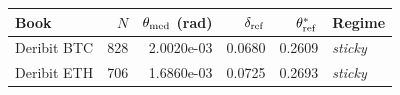 \begin{tabular}{@{}lrrrrl@{}}
\toprule
Book & $N$ & $\theta_{\rm med}$ (rad) & $\delta_{\rm ref}$ & $\theta^{*}_{\rm ref}$ & Regime \\
\midrule
Deribit BTC & 828 & 2.0020e-03 & 0.0680 & 0.2609 & \emph{sticky} \\
Deribit ETH & 706 & 1.6860e-03 & 0.0725 & 0.2693 & \emph{sticky} \\
\bottomrule
\end{tabular}